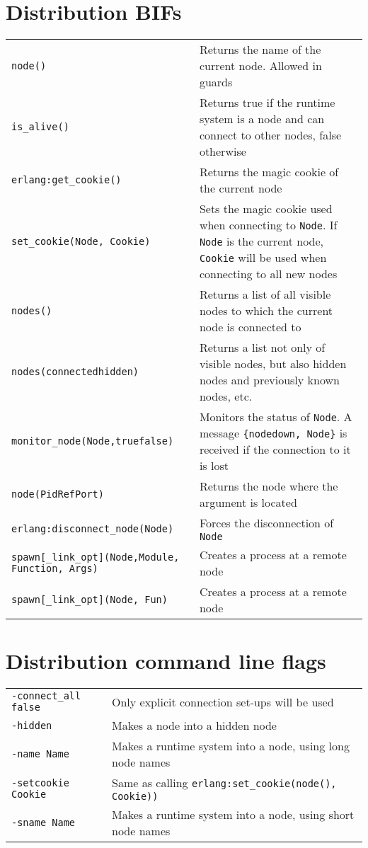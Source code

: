 \section{Distribution BIFs}

\begin{center}
\begin{tabular}{|>{\raggedright}p{156pt}|>{\raggedright}p{170pt}|}
\hline
\multicolumn{2}{|p{326pt}|}{Distribution BIFs}\tabularnewline
\hline
\texttt{node()}  & Returns the name of the current node. Allowed in guards\tabularnewline
\hline
\texttt{is\_alive()}  & Returns true if the runtime system is a node and can connect to
other nodes, false otherwise\tabularnewline
\hline
\texttt{erlang:get\_cookie()}  & Returns the magic cookie of the current node\tabularnewline
\hline
\texttt{set\_cookie(Node, Cookie)} & Sets the magic cookie used when connecting to \texttt{Node}.
If \texttt{Node} is the current node, \texttt{Cookie} will be used when connecting to all new nodes\tabularnewline
\hline
\texttt{nodes()}  & Returns a list of all visible nodes to which the current node is connected
to\tabularnewline
\hline
\texttt{nodes(connected\textbar{}hidden)}  & Returns a list not only of visible nodes,
but also hidden nodes and previously known nodes, etc. \tabularnewline
\hline
\texttt{monitor\_node(Node,}\break\texttt{\phantom{xxxx}true\textbar{}false)}  & Monitors the status of \texttt{Node}. A message
\texttt{\{nodedown, Node\}} is received if the connection to it is lost\tabularnewline
\hline
\texttt{node(Pid\textbar{}Ref\textbar{}Port)}  & Returns the node where the argument is
located\tabularnewline
\hline
\texttt{erlang:disconnect\_node(Node)}  & Forces the disconnection of \texttt{Node}\tabularnewline
\hline
\texttt{spawn[\_link\textbar{}\_opt](Node,}\break\texttt{\phantom{xxxx}Module, Function, Args)}  & Creates a process
at a remote node\tabularnewline
\hline
\texttt{spawn[\_link\textbar{}\_opt](Node, Fun)}  & Creates a process at a remote node\tabularnewline
\hline
\end{tabular}
\end{center}


\section{Distribution command line flags}

\begin{center}
\begin{tabular}{|>{\raggedright}p{102pt}|>{\raggedright}p{224pt}|}
\hline
\multicolumn{2}{|p{326pt}|}{Distribution command line flags}\tabularnewline
\hline
\texttt{-connect\_all false}  & Only explicit connection set-ups will be used\tabularnewline
\hline
\texttt{-hidden}  & Makes a node into a hidden node\tabularnewline
\hline
\texttt{-name Name}  & Makes a runtime system into a node, using long node names\tabularnewline
\hline
\texttt{-setcookie Cookie}  & Same as calling \linebreak{}
\texttt{erlang:set\_cookie(node(), Cookie))}\tabularnewline
\hline
\texttt{-sname Name}  & Makes a runtime system into a node, using short node names\tabularnewline
\hline
\end{tabular}
\end{center}


